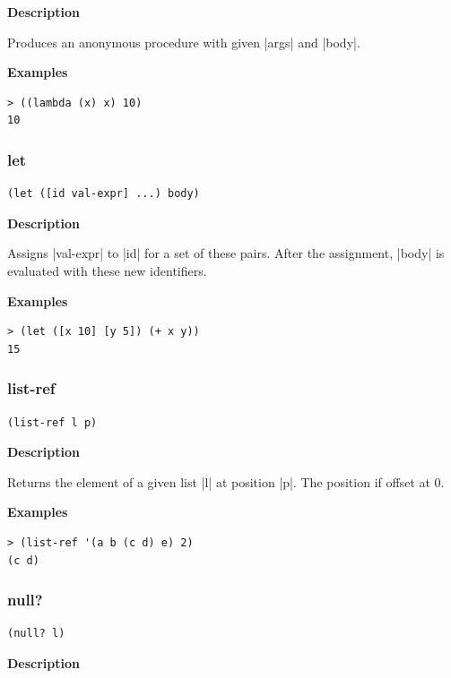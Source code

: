 \documentclass[a4paper]{article}
\begin{document}
\textbf{Description}

Produces an anonymous procedure with given |args| and |body|.

\textbf{Examples}

\begin{lstlisting}
> ((lambda (x) x) 10)
10
\end{lstlisting}

\subsubsection{let}

\begin{lstlisting}[frame=none]
(let ([id val-expr] ...) body)
\end{lstlisting}

\textbf{Description}

Assigns |val-expr| to |id| for a set of these pairs. After the assignment, |body| is evaluated with these new identifiers.

\textbf{Examples}

\begin{lstlisting}
> (let ([x 10] [y 5]) (+ x y))
15
\end{lstlisting}

\subsubsection{list-ref}

\begin{lstlisting}[frame=none]
(list-ref l p)
\end{lstlisting}

\textbf{Description}

Returns the element of a given list |l| at position |p|. The position if offset at 0.

\textbf{Examples}

\begin{lstlisting}
> (list-ref '(a b (c d) e) 2)
(c d)
\end{lstlisting}

\subsubsection{null?}

\begin{lstlisting}[frame=none]
(null? l)
\end{lstlisting}

\textbf{Description}
\end{document}
